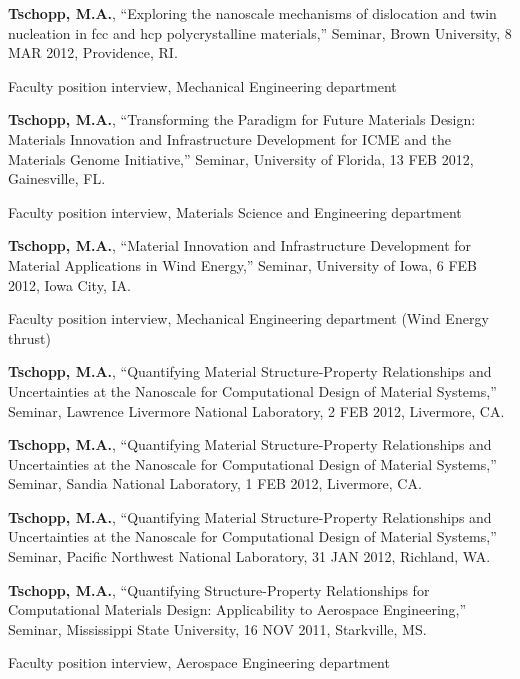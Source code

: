 \begin{cvlist}
\item
\textbf{Tschopp, M.A.}, ``Exploring the nanoscale mechanisms of dislocation and twin nucleation in fcc and hcp polycrystalline materials,'' Seminar, Brown University, 8 MAR 2012, Providence, RI.
\begin{list2}
\item[$\star$] Faculty position interview, Mechanical Engineering department
\end{list2}

\item
\textbf{Tschopp, M.A.}, ``Transforming the Paradigm for Future Materials Design: Materials Innovation and Infrastructure Development for ICME and the Materials Genome Initiative,'' Seminar, University of Florida, 13 FEB 2012, Gainesville, FL.
\begin{list2}
\item[$\star$] Faculty position interview, Materials Science and Engineering department
\end{list2}

\item
\textbf{Tschopp, M.A.}, ``Material Innovation and Infrastructure Development for Material Applications in Wind Energy,'' Seminar, University of Iowa, 6 FEB 2012, Iowa City, IA.
\begin{list2}
\item[$\star$] Faculty position interview, Mechanical Engineering department (Wind Energy thrust)
\end{list2}

\item
\textbf{Tschopp, M.A.}, ``Quantifying Material Structure-Property Relationships and Uncertainties at the Nanoscale for Computational Design of Material Systems,'' Seminar, Lawrence Livermore National Laboratory, 2 FEB 2012, Livermore, CA.

\item
\textbf{Tschopp, M.A.}, ``Quantifying Material Structure-Property Relationships and Uncertainties at the Nanoscale for Computational Design of Material Systems,'' Seminar, Sandia National Laboratory, 1 FEB 2012, Livermore, CA.

\item
\textbf{Tschopp, M.A.}, ``Quantifying Material Structure-Property Relationships and Uncertainties at the Nanoscale for Computational Design of Material Systems,'' Seminar, Pacific Northwest National Laboratory, 31 JAN 2012, Richland, WA.

\item
\textbf{Tschopp, M.A.}, ``Quantifying Structure-Property Relationships for Computational Materials Design: Applicability to Aerospace Engineering,'' Seminar, Mississippi State University, 16 NOV 2011, Starkville, MS.
\begin{list2}
\item[$\star$] Faculty position interview, Aerospace Engineering department
\end{list2}


\end{cvlist}
